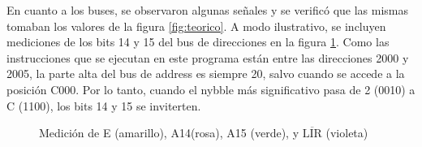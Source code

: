 \documentclass[micros_g1_main.tex]{subfiles}
\begin{document}
En cuanto a los buses, se observaron algunas se\~nales y se verific\'o que las mismas tomaban los valores de la figura \ref{fig:teorico}. A modo ilustrativo, se incluyen mediciones de los bits 14 y 15 del bus de direcciones en la figura \ref{fig:address-bus}. Como las instrucciones que se ejecutan en este programa est\'an entre las direcciones 2000 y 2005, la parte alta del bus de address es siempre 20, salvo cuando se accede a la posici\'on C000. Por lo tanto, cuando el nybble m\'as significativo pasa de 2 (0010) a C (1100), los bits 14 y 15 se inviterten.

\begin{figure}[ht]
	\centering
	\caption{Medici\'on de E (amarillo), A14(rosa), A15 (verde), y $\overline{\text{LIR}}$ (violeta)}
	\label{fig:address-bus}
\end{figure}
\end{document}
